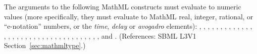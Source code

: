 The arguments to the following MathML constructs must evaluate to numeric
values (more specifically, they must evaluate to MathML real, integer,
rational, or ``e-notation'' numbers, or the \emph{time}, \emph{delay} or
\emph{avogadro}  elements): , ,
, , , ,
, , , ,
, , , ,
, , , , ,
, , , , ,
, , , , ,
, , , , ,
, , and .  (References: SBML L3V1
Section~\ref{sec:mathmltype}.)
